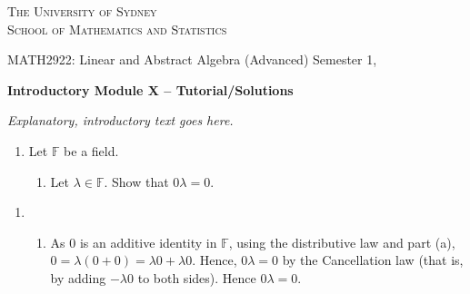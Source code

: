 \documentclass[a4paper, 11pt]{article}
\newcommand{\hln}{\vspace{-7mm}\begin{flushleft}\mbox{}\hrulefill\mbox{}\end{flushleft}\vspace{-7mm}}
\newcommand{\hsurround}[1]{\hln #1 \vspace{-6pt} \hln}
\newcommand{\F}{\mathbb{F}}
\theoremstyle{plain}
\theoremstyle{definition}
\begin{document}

	\thispagestyle{firstpage}
	
	\begin{center}
	
		\vspace*{-34pt}
		\textsc{The University of Sydney}\\
		
		\textsc{School of Mathematics and Statistics}
		\vspace{-3mm}
		
		\hsurround{MATH2922: Linear and Abstract Algebra (Advanced) \hfill Semester 1, \the\year{}}
		
	\end{center}
	
	\begin{center}
	
	{ \Large \textbf{Introductory Module X -- Tutorial/Solutions} }
	
	\textit{Explanatory, introductory text goes here. }
	\end{center}
	

\begin{enumerate}[wide, label = \textbf{\arabic*.}]

	\item Let $\F$ be a field.
	
	\begin{enumerate}[leftmargin=1.2cm]
	\item Let $\lambda \in \F$. Show that $0\lambda = 0$.
	\end{enumerate}
	
\end{enumerate}


\begin{enumerate}[wide, label = \textit{Solution to} \textbf{\arabic*.}]

	\item \phantom{.}
	
	\begin{enumerate}[leftmargin=1.2cm]
	\item As $0$ is an additive identity in $\F$, using the distributive law and part (a), $0 = \lambda (0 + 0) = \lambda0 + \lambda0$. Hence, $0\lambda = 0$ by the Cancellation law (that is, by adding $-\lambda0$ to both sides). Hence $0\lambda = 0$.
	\end{enumerate}
	
\end{enumerate}
\end{document}
